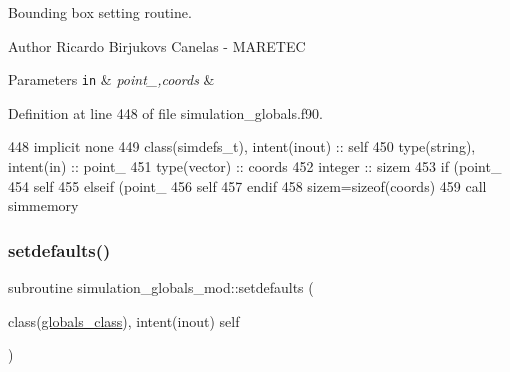 Bounding box setting routine. 

\begin{DoxyAuthor}{Author}
Ricardo Birjukovs Canelas -\/ M\+A\+R\+E\+T\+EC
\end{DoxyAuthor}

\begin{DoxyParams}[1]{Parameters}
\mbox{\tt in}  & {\em point\+\_\+,coords} & \\
\hline
\end{DoxyParams}


Definition at line 448 of file simulation\+\_\+globals.\+f90.


\begin{DoxyCode}
448     \textcolor{keywordtype}{implicit none}
449     \textcolor{keywordtype}{class}(simdefs\_t), \textcolor{keywordtype}{intent(inout)} :: self
450     \textcolor{keywordtype}{type}(string), \textcolor{keywordtype}{intent(in)} :: point\_
451     \textcolor{keywordtype}{type}(vector) :: coords
452     \textcolor{keywordtype}{integer} :: sizem
453     \textcolor{keywordflow}{if} (point\_%
454         self%
455     \textcolor{keywordflow}{elseif} (point\_%
456         self%
457 \textcolor{keywordflow}{    endif}
458     sizem=sizeof(coords)
459     \textcolor{keyword}{call }simmemory%
\end{DoxyCode}
\mbox{\label{namespacesimulation__globals__mod_ac2ac06271de377004c67b6ba2f3ed353}} 
\subsubsection{\texorpdfstring{setdefaults()}{setdefaults()}}
{\footnotesize\ttfamily subroutine simulation\+\_\+globals\+\_\+mod\+::setdefaults (\begin{DoxyParamCaption}\item[{class(\mbox{\hyperlink{structsimulation__globals__mod_1_1globals__class}{globals\+\_\+class}}), intent(inout)}]{self }\end{DoxyParamCaption})\hspace{0.3cm}{\ttfamily [private]}}



